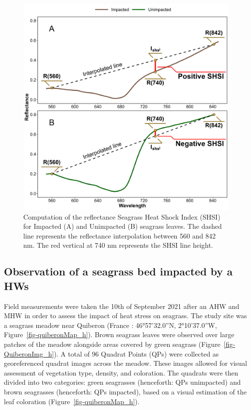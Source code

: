 \documentclass[
  letterpaper,
  11pt,
  english,
  singlespacing,
  headsepline]{MastersDoctoralThesis}
\begin{document}
\begin{spacing}{1.5}
\begin{figure}
{\includegraphics[width=0.95\linewidth,height=\textheight,keepaspectratio]{Chapter5/Figs/Plot_explain_SHSI.png}

}

\caption{\label{fig-SHSI_h}Computation of the reflectance Seagrass Heat
Shock Index (SHSI) for Impacted (A) and Unimpacted (B) seagrass leaves.
The dashed line represents the reflectance interpolation between 560 and
842 nm. The red vertical at 740 nm represents the SHSI line height.}

\end{figure}%

\subsection{Observation of a seagrass bed impacted by a
HWs}\label{observation-of-a-seagrass-bed-impacted-by-a-hws}

Field measurements were taken the 10th of September 2021 after an AHW
and MHW in order to assess the impact of heat stress on seagrass. The
study site was a seagrass meadow near Quiberon (France : 46°57'32.0''N,
2°10'37.0''W, Figure~\ref{fig-quiberonMap_h}). Brown seagrass leaves
were observed over large patches of the meadow alongside areas covered
by green seagrass (Figure~\ref{fig-QuiberonImg_h}). A total of 96
Quadrat Points (QPs) were collected as georeferenced quadrat images
across the meadow. These images allowed for visual assessment of
vegetation type, density, and coloration. The quadrats were then divided
into two categories: green seagrasses (henceforth: QPs unimpacted) and
brown seagrasses (henceforth: QPs impacted), based on a visual
estimation of the leaf coloration (Figure~\ref{fig-quiberonMap_h}).


\end{spacing}
\end{document}
